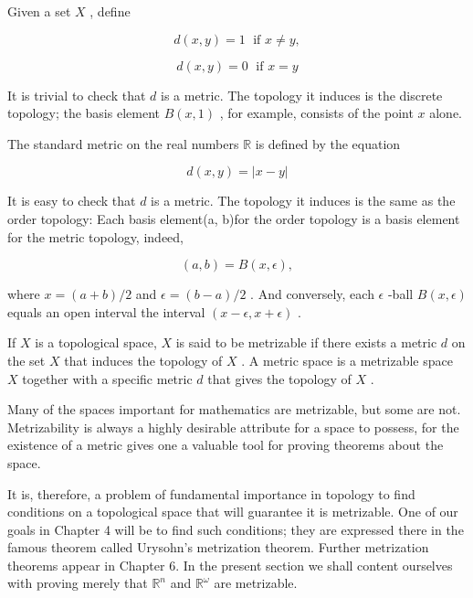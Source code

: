 \begin{example} Given a set \(X\) , define

\[
d\left( {x,y}\right)  = 1\;\text{ if }x \neq  y,
\]

\[
d\left( {x,y}\right)  = 0\;\text{ if }x = y
\]

It is trivial to check that \(d\) is a metric. The topology it induces is the discrete topology; the basis element \(B\left( {x,1}\right)\) , for example, consists of the point \(x\) alone.
\end{example}

\begin{example} The standard metric on the real numbers \(\mathbb{R}\) is defined by the equation

\[
d\left( {x,y}\right)  = \left| {x - y}\right|
\]

It is easy to check that \(d\) is a metric. The topology it induces is the same as the order topology: Each basis element(a, b)for the order topology is a basis element for the metric topology, indeed,

\[
\left( {a,b}\right)  = B\left( {x,\epsilon }\right) ,
\]

where \(x = \left( {a + b}\right) /2\) and \(\epsilon  = \left( {b - a}\right) /2\) . And conversely, each \(\epsilon\) -ball \(B\left( {x,\epsilon }\right)\) equals an open interval the interval \(\left( {x - \epsilon ,x + \epsilon }\right)\) .
\end{example}

\begin{definition} If \(X\) is a topological space, \(X\) is said to be metrizable if there exists a metric \(d\) on the set \(X\) that induces the topology of \(X\) . A metric space is a metrizable space \(X\) together with a specific metric \(d\) that gives the topology of \(X\) .
\end{definition}

Many of the spaces important for mathematics are metrizable, but some are not. Metrizability is always a highly desirable attribute for a space to possess, for the existence of a metric gives one a valuable tool for proving theorems about the space.

It is, therefore, a problem of fundamental importance in topology to find conditions on a topological space that will guarantee it is metrizable. One of our goals in Chapter 4 will be to find such conditions; they are expressed there in the famous theorem called Urysohn's metrization theorem. Further metrization theorems appear in Chapter 6. In the present section we shall content ourselves with proving merely that \({\mathbb{R}}^{n}\) and \({\mathbb{R}}^{\omega }\) are metrizable.

